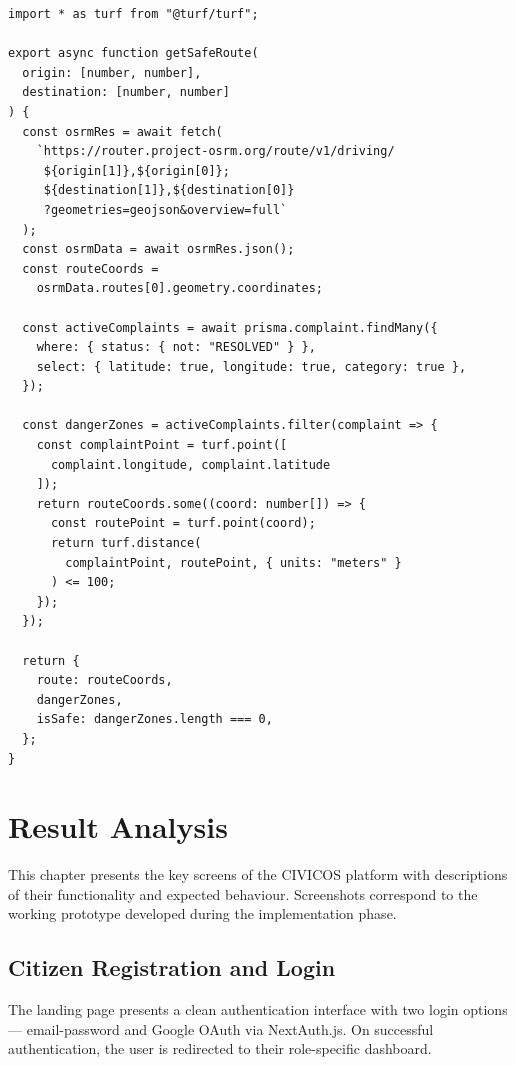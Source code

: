 \documentclass[12pt,a4paper]{report}
\begin{document}
\begin{lstlisting}[caption={AI Safe Routing Module ---
lib/routing/safeRoute.ts}]
import * as turf from "@turf/turf";

export async function getSafeRoute(
  origin: [number, number],
  destination: [number, number]
) {
  const osrmRes = await fetch(
    `https://router.project-osrm.org/route/v1/driving/
     ${origin[1]},${origin[0]};
     ${destination[1]},${destination[0]}
     ?geometries=geojson&overview=full`
  );
  const osrmData = await osrmRes.json();
  const routeCoords =
    osrmData.routes[0].geometry.coordinates;

  const activeComplaints = await prisma.complaint.findMany({
    where: { status: { not: "RESOLVED" } },
    select: { latitude: true, longitude: true, category: true },
  });

  const dangerZones = activeComplaints.filter(complaint => {
    const complaintPoint = turf.point([
      complaint.longitude, complaint.latitude
    ]);
    return routeCoords.some((coord: number[]) => {
      const routePoint = turf.point(coord);
      return turf.distance(
        complaintPoint, routePoint, { units: "meters" }
      ) <= 100;
    });
  });

  return {
    route: routeCoords,
    dangerZones,
    isSafe: dangerZones.length === 0,
  };
}
\end{lstlisting}

\chapter{Result Analysis}

This chapter presents the key screens of the CIVICOS platform with
descriptions of their functionality and expected behaviour. Screenshots
correspond to the working prototype developed during the implementation
phase.

\section{Citizen Registration and Login}

The landing page presents a clean authentication interface with two login
options --- email-password and Google OAuth via NextAuth.js. On successful
authentication, the user is redirected to their role-specific dashboard.
\end{document}

